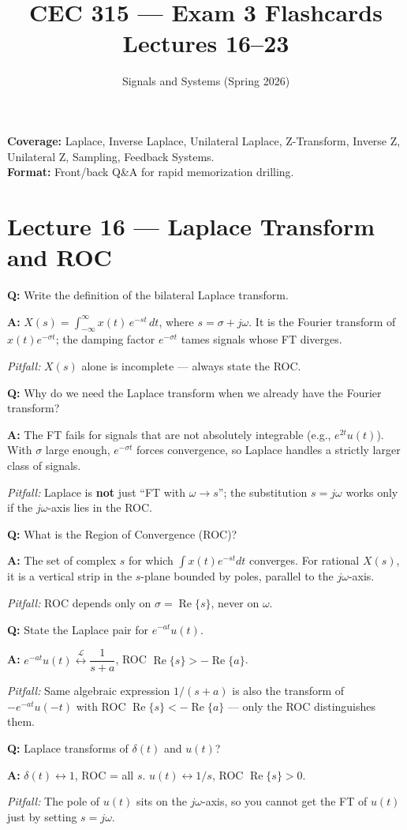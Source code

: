 \documentclass[11pt]{article}
\title{CEC 315 --- Exam 3 Flashcards \\ \large Lectures 16--23}
\author{Signals and Systems (Spring 2026)}
\date{}
\newcommand{\Q}[1]{\par\medskip\noindent\textbf{Q:} #1}
\newcommand{\A}[1]{\par\noindent\textbf{A:} #1}
\newcommand{\Pit}[1]{\par\noindent\textit{Pitfall:} #1}
\begin{document}
\maketitle

\noindent\textbf{Coverage:} Laplace, Inverse Laplace, Unilateral Laplace, Z-Transform, Inverse Z, Unilateral Z, Sampling, Feedback Systems. \\
\textbf{Format:} Front/back Q\&A for rapid memorization drilling.

\tableofcontents

\section{Lecture 16 --- Laplace Transform and ROC}

\Q{Write the definition of the bilateral Laplace transform.}
\A{$X(s) = \int_{-\infty}^{\infty} x(t)\,e^{-st}\,dt$, where $s = \sigma + j\omega$. It is the Fourier transform of $x(t)e^{-\sigma t}$; the damping factor $e^{-\sigma t}$ tames signals whose FT diverges.}
\Pit{$X(s)$ alone is incomplete --- always state the ROC.}

\Q{Why do we need the Laplace transform when we already have the Fourier transform?}
\A{The FT fails for signals that are not absolutely integrable (e.g., $e^{2t}u(t)$). With $\sigma$ large enough, $e^{-\sigma t}$ forces convergence, so Laplace handles a strictly larger class of signals.}
\Pit{Laplace is \textbf{not} just ``FT with $\omega\to s$''; the substitution $s=j\omega$ works only if the $j\omega$-axis lies in the ROC.}

\Q{What is the Region of Convergence (ROC)?}
\A{The set of complex $s$ for which $\int x(t)e^{-st}dt$ converges. For rational $X(s)$, it is a vertical strip in the $s$-plane bounded by poles, parallel to the $j\omega$-axis.}
\Pit{ROC depends only on $\sigma=\operatorname{Re}\{s\}$, never on $\omega$.}

\Q{State the Laplace pair for $e^{-at}u(t)$.}
\A{$e^{-at}u(t) \overset{\mathcal{L}}{\longleftrightarrow} \dfrac{1}{s+a}$, ROC $\operatorname{Re}\{s\} > -\operatorname{Re}\{a\}$.}
\Pit{Same algebraic expression $1/(s+a)$ is also the transform of $-e^{-at}u(-t)$ with ROC $\operatorname{Re}\{s\} < -\operatorname{Re}\{a\}$ --- only the ROC distinguishes them.}

\Q{Laplace transforms of $\delta(t)$ and $u(t)$?}
\A{$\delta(t) \leftrightarrow 1$, ROC = all $s$. $u(t) \leftrightarrow 1/s$, ROC $\operatorname{Re}\{s\}>0$.}
\Pit{The pole of $u(t)$ sits on the $j\omega$-axis, so you cannot get the FT of $u(t)$ just by setting $s=j\omega$.}
\end{document}
